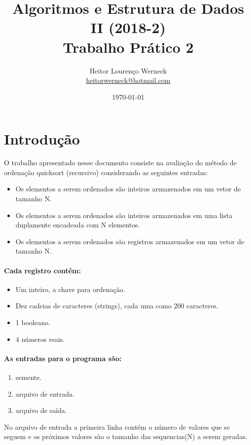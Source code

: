 \documentclass[11pt]{article}
\author{Heitor Lourenço Werneck \\{\href{mailto:heitorwerneck@hotmail.com}{heitorwerneck@hotmail.com}}}
\date{\today}
\title{Algoritmos e Estrutura de Dados II (2018-2)\\\medskip
\large Trabalho Prático 2}
\begin{document}
\maketitle
\tableofcontents

\newpage
\section{Introdução}
\label{sec:org57f5db9}

O trabalho apresentado nesse documento consiste na avaliação do método de ordenação quicksort (recursivo) considerando as seguintes entradas:
\begin{itemize}
\item Os elementos a serem ordenados são inteiros armazenados em um vetor de tamanho N.
\item Os  elementos  a  serem  ordenados  são  inteiros  armazenados  em  uma  lista  duplamente  encadeada  com N elementos.
\item Os  elementos  a  serem  ordenados  são  registros  armazenados  em  um  vetor  de  tamanho N.
\end{itemize}
\paragraph{Cada registro contém:}
\begin{itemize}
\item Um inteiro, a chave para ordenação.
\item Dez cadeias de caracteres (strings), cada uma como 200 caracteres.
\item 1 booleano.
\item 4 números reais.
\end{itemize}

\paragraph{As entradas para o programa são:}
\begin{enumerate}
\item semente.
\item arquivo de entrada.
\item arquivo de saída.
\end{enumerate}
No arquivo de entrada a primeira linha contém o número de valores que se seguem e os próximos valores são o tamanho das sequencias(N) a serem geradas.
\end{document}
